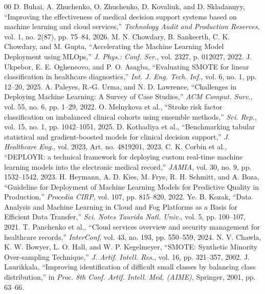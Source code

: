 \documentclass[10pt,twocolumn,a4paper]{article}
\begin{document}
\begin{thebibliography}{00}
 D. Buhai, A. Zhuchenko, O. Zhuchenko, D. Kovaliuk, and D. Skladannyy, ``Improving the effectiveness of medical decision support systems based on machine learning and cloud services,'' \textit{Technology Audit and Production Reserves}, vol. 1, no. 2(87), pp. 75--84, 2026.
 M. N. Chowdary, B. Sankeerth, C. K. Chowdary, and M. Gupta, ``Accelerating the Machine Learning Model Deployment using MLOps,'' \textit{J. Phys.: Conf. Ser.}, vol. 2327, p. 012027, 2022.
 J. Ukpebor, E. E. Ogheneovo, and P. O. Asagba, ``Evaluating SMOTE for linear classification in healthcare diagnostics,'' \textit{Int. J. Eng. Tech. Inf.}, vol. 6, no. 1, pp. 12--20, 2025.
 A. Paleyes, R.-G. Urma, and N. D. Lawrence, ``Challenges in Deploying Machine Learning: A Survey of Case Studies,'' \textit{ACM Comput. Surv.}, vol. 55, no. 6, pp. 1--29, 2022.
 O. Melnykova et al., ``Stroke risk factor classification on imbalanced clinical cohorts using ensemble methods,'' \textit{Sci. Rep.}, vol. 15, no. 1, pp. 1042--1051, 2025.
 D. Kothadiya et al., ``Benchmarking tabular statistical and gradient-boosted models for clinical decision support,'' \textit{J. Healthcare Eng.}, vol. 2023, Art. no. 4819201, 2023.
 C. K. Corbin et al., ``DEPLOYR: a technical framework for deploying custom real-time machine learning models into the electronic medical record,'' \textit{JAMIA}, vol. 30, no. 9, pp. 1532--1542, 2023.
 H. Heymann, A. D. Kies, M. Frye, R. H. Schmitt, and A. Boza, ``Guideline for Deployment of Machine Learning Models for Predictive Quality in Production,'' \textit{Procedia CIRP}, vol. 107, pp. 815--820, 2022.
 Ye. B. Kozak, ``Data Analysis and Machine Learning in Cloud and Fog Platforms as a Basis for Efficient Data Transfer,'' \textit{Sci. Notes Taurida Natl. Univ.}, vol. 5, pp. 100--107, 2021.
 T. Panchenko et al., ``Cloud services overview and security management for healthcare records,'' \textit{InterConf}, vol. 43, no. 193, pp. 550--559, 2024.
 N. V. Chawla, K. W. Bowyer, L. O. Hall, and W. P. Kegelmeyer, ``SMOTE: Synthetic Minority Over-sampling Technique,'' \textit{J. Artif. Intell. Res.}, vol. 16, pp. 321--357, 2002.
 J. Laurikkala, ``Improving identification of difficult small classes by balancing class distribution,'' in \textit{Proc. 8th Conf. Artif. Intell. Med. (AIME)}, Springer, 2001, pp. 63--66.

\end{thebibliography}
\end{document}
